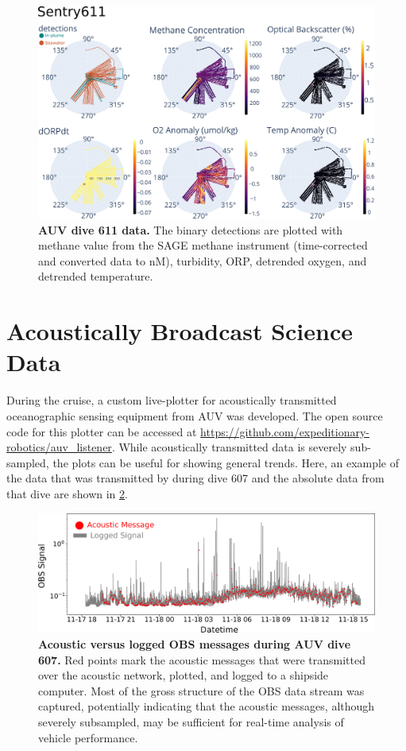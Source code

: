 \begin{figure}
    \centering
    \includegraphics[width=1\columnwidth]{figures/app_sentry611_data.png}
    \caption[AUV \Sentry dive 611 data.]{\textbf{AUV \Sentry dive 611 data.} The binary detections are plotted with methane value from the SAGE methane instrument (time-corrected and converted data to nM), turbidity, ORP, detrended oxygen, and detrended temperature.}
    \label{fig:app:field:sentry611}
\end{figure}

\newpage
\section{Acoustically Broadcast Science Data}
During the cruise, a custom live-plotter for acoustically transmitted oceanographic sensing equipment from AUV \Sentry was developed. The open source code for this plotter can be accessed at \url{https://github.com/expeditionary-robotics/auv_listener}. While acoustically transmitted data is severely sub-sampled, the plots can be useful for showing general trends. Here, an example of the data that was transmitted by \Sentry during dive 607 and the absolute data from that dive are shown in \cref{fig:app:field:plotter}.

\begin{figure}[h!]
    \centering
    \includegraphics[width=1\columnwidth]{figures/acomms.png}
    \caption[Acoustic versus logged OBS messages during AUV \Sentry dive 607]{\textbf{Acoustic versus logged OBS messages during AUV \Sentry dive 607.} Red points mark the acoustic messages that were transmitted over the acoustic \Sentry network, plotted, and logged to a shipside computer. Most of the gross structure of the OBS data stream was captured, potentially indicating that the acoustic messages, although severely subsampled, may be sufficient for real-time analysis of vehicle performance.}
    \label{fig:app:field:plotter}
\end{figure}

